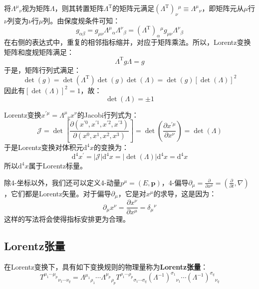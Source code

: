\documentclass{book}
\begin{document}
将$\Lambda^\mu{}_\nu$视为矩阵$\Lambda$，则其转置矩阵$\Lambda^\mathrm{T}$的矩阵元满足$(\Lambda^\mathrm{T})_\nu{}^\mu\equiv\Lambda^\mu{}_\nu$，即矩阵元从$\mu$行$\nu$列变为$\nu$行$\mu$列。由保度规条件可知：
\begin{equation}
	g_{\alpha\beta}=g_{\mu\nu}\Lambda^\mu{}_\alpha\Lambda^\nu {}_\beta=(\Lambda^{\mathrm{T}})_\alpha{}^\mu g_{\mu\nu}\Lambda^\nu{}_\beta
\end{equation}
在右侧的表达式中，重复的相邻指标缩并，对应于矩阵乘法。所以，Lorentz变换矩阵和度规矩阵满足：
\begin{equation}
	\Lambda^\mathrm{T} g\Lambda=g
\end{equation}
于是，矩阵行列式满足：
\begin{equation}
	\det(g)=\det(\Lambda^{\mathrm{T}})\det(g)\det(\Lambda)=\det(g)[\det(\Lambda)]^2
\end{equation}
因此有$[\det(\Lambda)]^2=1$，故：
\begin{equation}
	\det(\Lambda)=\pm1
\end{equation}

Lorentz变换$x^{\prime\mu}=\Lambda^\mu{}_\nu x^\nu$的Jacobi行列式为：
\begin{equation}
\mathcal{J}=\det\left[\frac{\partial(x^{\prime0},x^{\prime1},x^{\prime2},x^{\prime3})}{\partial(x^0,x^1,x^2,x^3)}\right]=\det\left(\frac{\partial x^{\prime\mu}}{\partial x^{\nu}}\right)=\det(\Lambda) 
\end{equation}
于是Lorentz变换对体积元$\mathrm{d}^4x$的变换为：
\begin{equation}
	\mathrm{d}^4x^\prime=\left|\mathcal{J}\right|\mathrm{d}^4x=\left|\det(\Lambda)\right|\mathrm{d}^4x=\mathrm{d}^4x
\end{equation}
所以$\mathrm{d}^4x$属于Lorentz标量。

除4-坐标以外，我们还可以定义4-动量$p^\mu=(E,\mathbf{p})$，4-偏导$\partial_\mu=\frac{\partial}{\partial x^\mu}=(\frac{\partial}{\partial t},\nabla)$，它们都是Lorentz矢量。对于偏导$\partial_\mu$，它是对$x^\mu$的求导，这是因为：
\begin{equation}
	\partial_\mu x^\nu=\frac{\partial x^\nu}{\partial x^\mu}=\delta_\mu{}^\nu
\end{equation}
这样的写法将会使得指标安排更为合理。
\subsection{Lorentz张量}
在Lorentz变换下，具有如下变换规则的物理量称为\textbf{Lorentz张量}：
\begin{equation}
	T^{\mu_1\cdots\mu_p}{}_{\nu_1\cdots\nu_q}=\Lambda^{\mu_1}{}_{\rho_1}\cdots\Lambda^{\mu_p}{}_{\rho_p}T^{\rho_1\cdots\rho_p}{}_{\sigma_1\cdots\sigma_q}(\Lambda^{-1})^{\sigma_1}{}_{\nu_1}\cdots(\Lambda^{-1})^{\sigma_q}{}_{\nu_q}
\end{equation}
\end{document}
